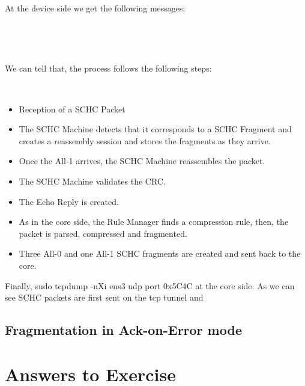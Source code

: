 \documentclass[onecolumn,12pt]{book}
\newcounter{c}
\begin{document}
~

At the device side we get the following messages:

~



~

We can tell that, the process follows the following steps:

~

\begin{itemize}
    \item Reception of a SCHC Packet
    \item The SCHC Machine detects that it corresponds to a SCHC Fragment and creates a reassembly session and stores the fragments as they arrive.
    \item Once the All-1 arrives, the SCHC Machine reassembles the packet.
    \item The SCHC Machine validates the CRC.
    \item The Echo Reply is created.
    \item As in the core side, the Rule Manager finds a compression rule, then, the packet is parsed, compressed and fragmented.
    \item Three All-0 and one All-1 SCHC fragments are created and sent back to the core.
\end{itemize}

Finally, sudo tcpdump -nXi ens3 udp port 0x5C4C at the core side. 
As we can see SCHC packets are first sent on the tcp tunnel and


\section{Fragmentation in Ack-on-Error mode}

\chapter{Answers to Exercise}



\end{document}

